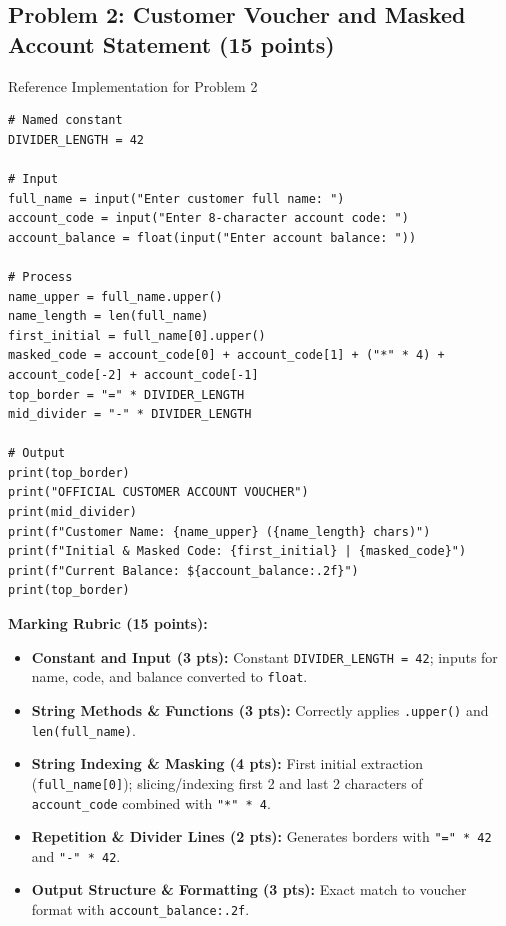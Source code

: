 \documentclass[11pt,a4paper]{article}
\begin{document}
\subsection*{Problem 2: Customer Voucher and Masked Account Statement (15 points)}
\begin{solbox}{Reference Implementation for Problem 2}
\begin{lstlisting}
# Named constant
DIVIDER_LENGTH = 42

# Input
full_name = input("Enter customer full name: ")
account_code = input("Enter 8-character account code: ")
account_balance = float(input("Enter account balance: "))

# Process
name_upper = full_name.upper()
name_length = len(full_name)
first_initial = full_name[0].upper()
masked_code = account_code[0] + account_code[1] + ("*" * 4) + account_code[-2] + account_code[-1]
top_border = "=" * DIVIDER_LENGTH
mid_divider = "-" * DIVIDER_LENGTH

# Output
print(top_border)
print("OFFICIAL CUSTOMER ACCOUNT VOUCHER")
print(mid_divider)
print(f"Customer Name: {name_upper} ({name_length} chars)")
print(f"Initial & Masked Code: {first_initial} | {masked_code}")
print(f"Current Balance: ${account_balance:.2f}")
print(top_border)
\end{lstlisting}
\textbf{Marking Rubric (15 points):}
\begin{itemize}[leftmargin=2em]
  \item \textbf{Constant and Input (3 pts):} Constant \texttt{DIVIDER\_LENGTH = 42}; inputs for name, code, and balance converted to \texttt{float}.
  \item \textbf{String Methods \& Functions (3 pts):} Correctly applies \texttt{.upper()} and \texttt{len(full\_name)}.
  \item \textbf{String Indexing \& Masking (4 pts):} First initial extraction (\texttt{full\_name[0]}); slicing/indexing first 2 and last 2 characters of \texttt{account\_code} combined with \texttt{"*" * 4}.
  \item \textbf{Repetition \& Divider Lines (2 pts):} Generates borders with \texttt{"=" * 42} and \texttt{"-" * 42}.
  \item \textbf{Output Structure \& Formatting (3 pts):} Exact match to voucher format with \texttt{account\_balance:.2f}.
\end{itemize}
\end{solbox}
\end{document}
